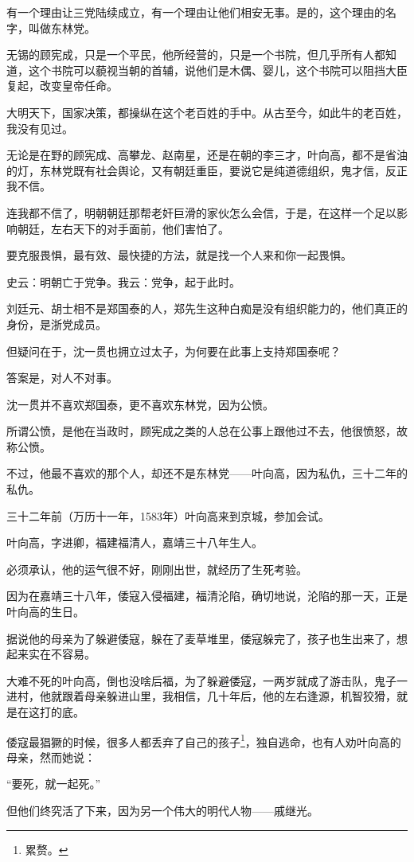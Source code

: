 \begin{multicols}{\theparacolNo}
有一个理由让三党陆续成立，有一个理由让他们相安无事。是的，这个理由的名字，叫做东林党。

无锡的顾宪成，只是一个平民，他所经营的，只是一个书院，但几乎所有人都知道，这个书院可以藐视当朝的首辅，说他们是木偶、婴儿，这个书院可以阻挡大臣复起，改变皇帝任命。

大明天下，国家决策，都操纵在这个老百姓的手中。从古至今，如此牛的老百姓，我没有见过。

无论是在野的顾宪成、高攀龙、赵南星，还是在朝的李三才，叶向高，都不是省油的灯，东林党既有社会舆论，又有朝廷重臣，要说它是纯道德组织，鬼才信，反正我不信。

连我都不信了，明朝朝廷那帮老奸巨滑的家伙怎么会信，于是，在这样一个足以影响朝廷，左右天下的对手面前，他们害怕了。

要克服畏惧，最有效、最快捷的方法，就是找一个人来和你一起畏惧。

史云：明朝亡于党争。我云：党争，起于此时。

刘廷元、胡士相不是郑国泰的人，郑先生这种白痴是没有组织能力的，他们真正的身份，是浙党成员。

但疑问在于，沈一贯也拥立过太子，为何要在此事上支持郑国泰呢？

答案是，对人不对事。

沈一贯并不喜欢郑国泰，更不喜欢东林党，因为公愤。

所谓公愤，是他在当政时，顾宪成之类的人总在公事上跟他过不去，他很愤怒，故称公愤。

不过，他最不喜欢的那个人，却还不是东林党——叶向高，因为私仇，三十二年的私仇。

三十二年前（万历十一年，1583年）叶向高来到京城，参加会试。

叶向高，字进卿，福建福清人，嘉靖三十八年生人。

必须承认，他的运气很不好，刚刚出世，就经历了生死考验。

因为在嘉靖三十八年，倭寇入侵福建，福清沦陷，确切地说，沦陷的那一天，正是叶向高的生日。

据说他的母亲为了躲避倭寇，躲在了麦草堆里，倭寇躲完了，孩子也生出来了，想起来实在不容易。

大难不死的叶向高，倒也没啥后福，为了躲避倭寇，一两岁就成了游击队，鬼子一进村，他就跟着母亲躲进山里，我相信，几十年后，他的左右逢源，机智狡猾，就是在这打的底。

倭寇最猖獗的时候，很多人都丢弃了自己的孩子\footnote{累赘。}，独自逃命，也有人劝叶向高的母亲，然而她说：

“要死，就一起死。”

但他们终究活了下来，因为另一个伟大的明代人物——戚继光。


\end{multicols}
